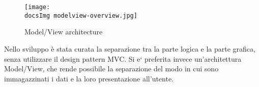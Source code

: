 {{	\begin{figure}[h]
		\begin{center}
			\texttt{[image: \\docsImg modelview-overview.jpg]}
			\caption{Model/View architecture}
		\end{center}
	\end{figure}
		Nello sviluppo è stata curata la separazione tra la parte logica e la parte grafica, senza utilizzare il design pattern MVC. Si e` preferita invece un'architettura Model/View, che rende possibile la separazione del modo in cui sono immagazzinati i dati e la loro presentazione all'utente. %
	}
}
